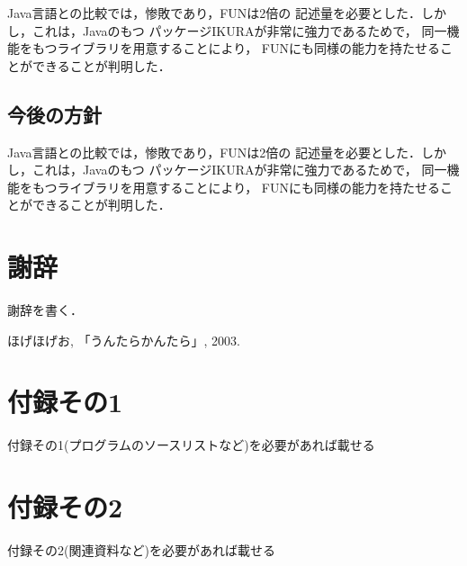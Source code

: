 \documentclass{funthesis}
\begin{document}
Java言語との比較では，惨敗であり，FUNは2倍の
記述量を必要とした．しかし，これは，Javaのもつ
パッケージIKURAが非常に強力であるためで，
同一機能をもつライブラリを用意することにより，
FUNにも同様の能力を持たせることができることが判明した．

\section{今後の方針}

Java言語との比較では，惨敗であり，FUNは2倍の
記述量を必要とした．しかし，これは，Javaのもつ
パッケージIKURAが非常に強力であるためで，
同一機能をもつライブラリを用意することにより，
FUNにも同様の能力を持たせることができることが判明した．


\chapter*{謝辞}

謝辞を書く．


\begin{thebibliography}{9}
  ほげほげお, 「うんたらかんたら」, 2003.
\end{thebibliography}


\appendix

\chapter*{付録その1} %

付録その1(プログラムのソースリストなど)を必要があれば載せる

\chapter*{付録その2}

付録その2(関連資料など)を必要があれば載せる

\listoffigures

\listoftables
\end{document}
